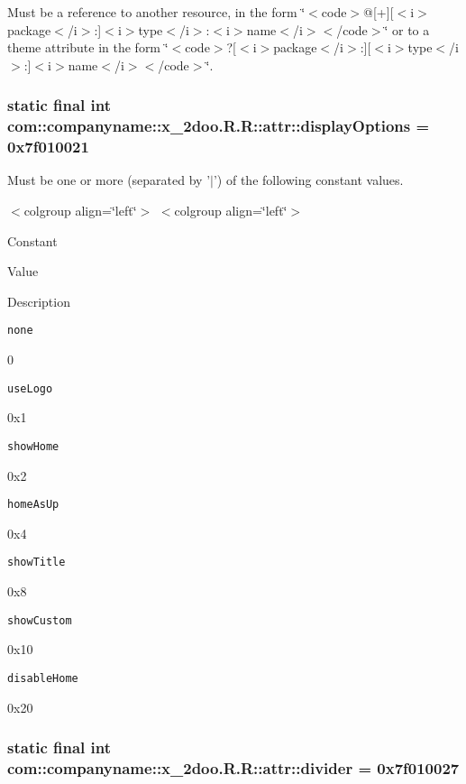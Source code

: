 Must be a reference to another resource, in the form \char`\"{}$<$code$>$@\mbox{[}+\mbox{]}\mbox{[}$<$i$>$package$<$/i$>$:\mbox{]}$<$i$>$type$<$/i$>$:$<$i$>$name$<$/i$>$$<$/code$>$\char`\"{} or to a theme attribute in the form \char`\"{}$<$code$>$?\mbox{[}$<$i$>$package$<$/i$>$:\mbox{]}\mbox{[}$<$i$>$type$<$/i$>$:\mbox{]}$<$i$>$name$<$/i$>$$<$/code$>$\char`\"{}. \hypertarget{classcom_1_1companyname_1_1x__2doo_1_1_r_1_1attr_6fefabe23ed61c906c80592b44af3092}{
\subsubsection[{displayOptions}]{\setlength{\rightskip}{0pt plus 5cm}static final int com::companyname::x\_\-2doo.R.R::attr::displayOptions = 0x7f010021}}
\label{classcom_1_1companyname_1_1x__2doo_1_1_r_1_1attr_6fefabe23ed61c906c80592b44af3092}


Must be one or more (separated by '$|$') of the following constant values. \begin{TabularC}{0}
\hline
\end{TabularC}
$<$colgroup align=\char`\"{}left\char`\"{}$>$ $<$colgroup align=\char`\"{}left\char`\"{}$>$ 

Constant

Value

Description 

{\tt none}

0

{\tt useLogo}

0x1

{\tt showHome}

0x2

{\tt homeAsUp}

0x4

{\tt showTitle}

0x8

{\tt showCustom}

0x10

{\tt disableHome}

0x20\hypertarget{classcom_1_1companyname_1_1x__2doo_1_1_r_1_1attr_3c36e19f15695ee78d2af0600da21466}{
\subsubsection[{divider}]{\setlength{\rightskip}{0pt plus 5cm}static final int com::companyname::x\_\-2doo.R.R::attr::divider = 0x7f010027}}
\label{classcom_1_1companyname_1_1x__2doo_1_1_r_1_1attr_3c36e19f15695ee78d2af0600da21466}


